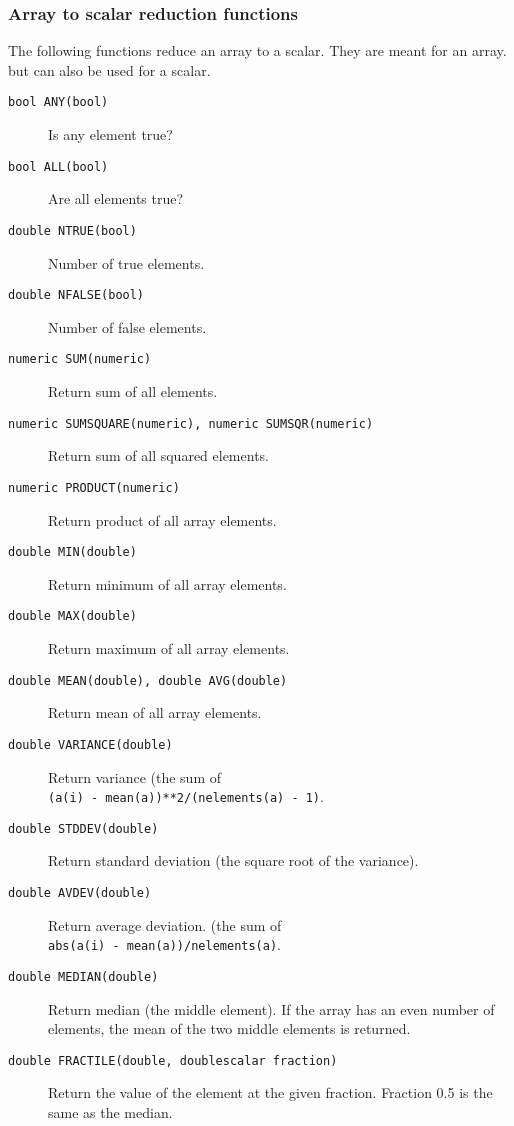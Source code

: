 \subsubsection{Array to scalar reduction functions}
The following functions reduce an array to a scalar.
They are meant for an array. but can also be used for a scalar.
\begin{description}
  \item[ \texttt{bool ANY(bool)}] Is any element true?
  \item[ \texttt{bool ALL(bool)}] Are all elements true?
  \item[ \texttt{double NTRUE(bool)}] Number of true elements.
  \item[ \texttt{double NFALSE(bool)}] Number of false elements.
  \item[ \texttt{numeric SUM(numeric)}] Return sum of all elements.
  \item[ \texttt{numeric SUMSQUARE(numeric), numeric SUMSQR(numeric)}]
       Return sum of all squared elements.
  \item[ \texttt{numeric PRODUCT(numeric)}] Return product
    of all array elements.
  \item[ \texttt{double MIN(double)}] Return minimum
    of all array elements.
  \item[ \texttt{double MAX(double)}] Return maximum
    of all array elements.
  \item[ \texttt{double MEAN(double), double AVG(double)}]
    Return mean of all array elements.
  \item[ \texttt{double VARIANCE(double)}] Return variance
    (the sum of
    \\\texttt{(a(i) - mean(a))**2/(nelements(a) - 1)}.
  \item[ \texttt{double STDDEV(double)}] Return standard
    deviation (the square root of the variance).
  \item[ \texttt{double AVDEV(double)}] Return average deviation.
    (the sum of
    \\\texttt{abs(a(i) - mean(a))/nelements(a)}.
  \item[ \texttt{double MEDIAN(double)}] Return median (the
    middle element).
    If the array has an even number of elements, the mean of
    the two middle elements is returned.
  \item[ \texttt{double FRACTILE(double, doublescalar fraction)}]
       Return the value of the element at the given fraction.
       Fraction 0.5 is the same as the median.
\end{description}

